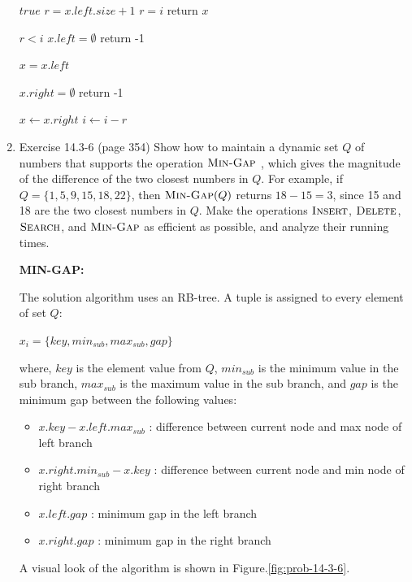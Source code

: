 \documentclass[11pt]{article}
\begin{document}
\begin{enumerate}
\begin{codebox}
		\li \While $true$				
		\Do	
 		\li $r = x.left.size+1$
		\li \If $r=i$
		\li 	\Do
					return $x$
				\End
		
		\li \If $r<i$
				\Do	
		\li 		\If $x.left=\emptyset$
		\li 		\Do	
						return -1
					\End
				
		\li		$x = x.left$

		\li \ElseIf
		\li 	\Do	
		\li 		\If $x.right=\emptyset$
		\li 		\Do	
						return -1
					\End
					
		\li		$x \gets x.right$
		\li		$i \gets i-r$			
				\End
		\End
		
	\end{codebox}


\pagebreak


\item Exercise 14.3-6 (page 354) Show how to maintain a dynamic set $Q$ of numbers that supports the operation $\textnormal{\scshape Min-Gap}$ , which gives the magnitude of the difference of the two closest numbers in $Q$. For example, if $Q=\{1, 5, 9, 15, 18, 22\}$, then $\textnormal{\scshape Min-Gap}(Q)$ returns $18-15=3$, since 15 and 18 are the two closest numbers in $Q$. Make the operations $\textnormal{\scshape Insert}$, $\textnormal{\scshape Delete}$, $\textnormal{\scshape Search}$, and 
$\textnormal{\scshape Min-Gap}$ as efficient as possible, and analyze their running times.

	\textbf{MIN-GAP:} 

	The solution algorithm uses an RB-tree. A tuple is assigned to every element of set $Q$:
	
	\hspace{10mm} $x_i = \{key, min_{sub}, max_{sub}, gap\}$
	
	where, $key$ is the element value from $Q$, $min_{sub}$ is the minimum value in the sub branch, $max_{sub}$ is the maximum value in the sub branch, and $gap$ is the minimum gap between the following values:

	\begin{itemize}
		\item $x.key-x.left.max_{sub}$ : difference between current node and max node of left branch 
		\item $x.right.min_{sub}-x.key$ : difference between current node and min node of right branch
		\item $x.left.gap$ : minimum gap in the left branch
		\item $x.right.gap$ : minimum gap in the right branch
	\end{itemize}
    
	A visual look of the algorithm is shown in Figure.\ref{fig:prob-14-3-6}.
        

\end{enumerate}
\end{document}

